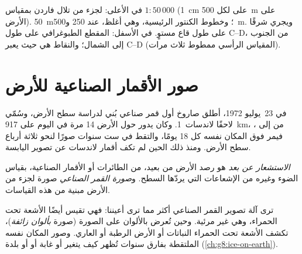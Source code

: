 \begin{omfigure}
{\small في الأعلى:  لجزء من تلال فاردن بمقياس $1 : 50\,000$
(\qty{1}{cm} على  لكل \qty{500}{m} على الأرض). 
\qty{50}{m}؛ وخطوط الكنتور الرئيسية، وهي أغلظ، عند 250 و\qty{500}{m}.
ويجري  شرقًا على طول قاع  مستوٍ. في الأسفل: المقطع الطبوغرافي
على طول C--D، من الجنوب إلى الشمال؛ والنقاط هي حيث يعبر C--D 
(المقياس الرأسي ممطوط ثلاث مرات).}
\label{fig:g9:maps-of-the-earth:topo}
\end{omfigure}

\section{صور الأقمار الصناعية للأرض}

في 23~يوليو 1972، أطلق صاروخ أول قمر صناعي بُني لدراسة سطح الأرض، وسُمّي
لاحقًا لاندسات~1. وكان يدور حول الأرض 14 مرة في اليوم على 
\qty{917}{km}، من  إلى ، فيمر فوق المكان نفسه كل 18 يومًا، والتقط
في ست سنوات صورًا لنحو ثلاثة أرباع سطح الأرض. ومنذ ذلك الحين لم تكف
أقمار لاندسات عن تصوير
اليابسة.

\begin{definition}\label{def:g9:maps-of-the-earth:remote-sensing}
\emph{الاستشعار عن بعد} هو رصد الأرض من بعيد، من
الطائرات أو الأقمار الصناعية، بقياس الضوء وغيره من الإشعاعات التي يردّها
السطح. و\emph{صورة القمر الصناعي} صورة لجزء من
الأرض مبنية من هذه
القياسات.
\end{definition}

ترى آلة تصوير القمر الصناعي أكثر مما ترى أعيننا: فهي تقيس أيضًا الأشعة
تحت الحمراء، وهي غير مرئية. وحين تُعرض بالألوان على الصورة (صورة
\emph{بألوان زائفة})، تكشف الأشعة تحت الحمراء النباتات أو الأرض الرطبة أو
 العاري. وصور المكان نفسه الملتقطة بفارق سنوات تُظهر كيف يتغير 
أو غابة أو  أو بلدة (\cref{ch:g8:ice-on-earth}).

